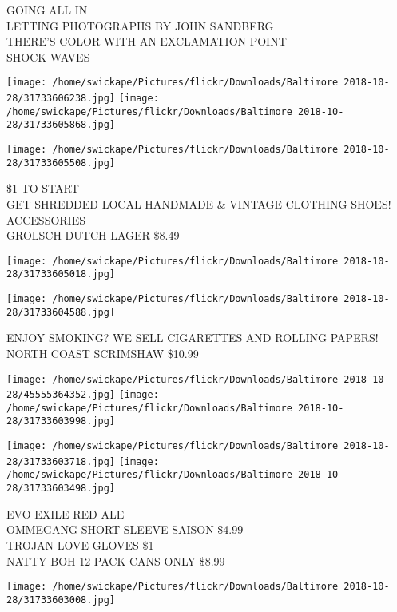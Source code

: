 \documentclass[10pt,letterpaper]{article}
\begin{document}
GOING ALL IN\\
LETTING PHOTOGRAPHS BY JOHN SANDBERG\\
THERE'S COLOR WITH AN EXCLAMATION POINT\\
SHOCK WAVES\\
\pagebreak

\texttt{[image: /home/swickape/Pictures/flickr/Downloads/Baltimore 2018-10-28/31733606238.jpg]}
\texttt{[image: /home/swickape/Pictures/flickr/Downloads/Baltimore 2018-10-28/31733605868.jpg]}

\texttt{[image: /home/swickape/Pictures/flickr/Downloads/Baltimore 2018-10-28/31733605508.jpg]}

\$1 TO START\\
GET SHREDDED LOCAL HANDMADE \& VINTAGE CLOTHING SHOES! ACCESSORIES\\
GROLSCH DUTCH LAGER \$8.49\\
\pagebreak

\texttt{[image: /home/swickape/Pictures/flickr/Downloads/Baltimore 2018-10-28/31733605018.jpg]}

\vspace{0.25in}
\texttt{[image: /home/swickape/Pictures/flickr/Downloads/Baltimore 2018-10-28/31733604588.jpg]}

ENJOY SMOKING?  WE SELL CIGARETTES AND ROLLING PAPERS!\\
NORTH COAST SCRIMSHAW \$10.99\\
\pagebreak

\texttt{[image: /home/swickape/Pictures/flickr/Downloads/Baltimore 2018-10-28/45555364352.jpg]}
\texttt{[image: /home/swickape/Pictures/flickr/Downloads/Baltimore 2018-10-28/31733603998.jpg]}

\texttt{[image: /home/swickape/Pictures/flickr/Downloads/Baltimore 2018-10-28/31733603718.jpg]}
\texttt{[image: /home/swickape/Pictures/flickr/Downloads/Baltimore 2018-10-28/31733603498.jpg]}

EVO EXILE RED ALE\\
OMMEGANG SHORT SLEEVE SAISON \$4.99\\
TROJAN LOVE GLOVES \$1\\
NATTY BOH 12 PACK CANS ONLY \$8.99\\
\pagebreak

\texttt{[image: /home/swickape/Pictures/flickr/Downloads/Baltimore 2018-10-28/31733603008.jpg]}
\end{document}
